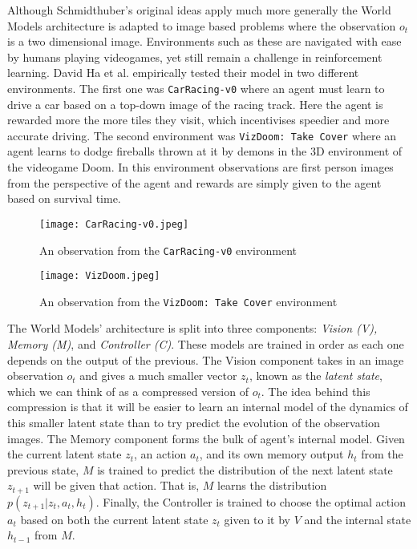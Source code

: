 \documentclass{article}
\numberwithin{figure}{section}
\theoremstyle{definition}
\begin{document}
Although Schmidthuber's original ideas apply much more generally the World Models architecture is adapted to image based problems where the observation $o_t$ is a two dimensional image.
Environments such as these are navigated with ease by humans playing videogames, yet still remain a challenge in reinforcement learning.
David Ha et al. empirically tested their model in two different environments.
The first one was \texttt{CarRacing-v0} where an agent must learn to drive a car based on a top-down image of the racing track. %
Here the agent is rewarded more the more tiles they visit, which incentivises speedier and more accurate driving.
The second environment was \texttt{VizDoom: Take Cover} where an agent learns to dodge fireballs thrown at it by demons in the 3D environment of the videogame Doom.
In this environment observations are first person images from the perspective of the agent and rewards are simply given to the agent based on survival time.

\begin{figure}[h]
  \centering
  \begin{minipage}{0.45\textwidth}
      \centering
      \texttt{[image: CarRacing-v0.jpeg]} %
      \caption{An observation from the \texttt{CarRacing-v0} environment}
  \end{minipage}\hfill
  \begin{minipage}{0.45\textwidth}
      \centering
      \texttt{[image: VizDoom.jpeg]} %
      \caption{An observation from the \texttt{VizDoom: Take Cover} environment}
  \end{minipage}
\end{figure}

The World Models' architecture is split into three components: \textit{Vision (V), Memory (M)}, and \textit{Controller (C)}.
These models are trained in order as each one depends on the output of the previous.
The Vision component %
takes in an image observation $o_t$ and gives a much smaller vector $z_t$, known as the \textit{latent state}, which we can think of as a compressed version of $o_t$.
The idea behind this compression is that it will be easier to learn an internal model of the dynamics of this smaller latent state than to try predict the evolution of the observation images. 
The Memory component forms the bulk of agent's internal model.
Given the current latent state $z_t$, an action $a_t$, and its own memory output $h_{t}$ from the previous state, $M$ is trained to predict the distribution of the next latent state $z_{t+1}$ will be given that action.
That is, $M$ learns the distribution $p(z_{t+1} | z_t, a_t, h_t)$.
Finally, the Controller is trained to choose the optimal action $a_t$ based on both the current latent state $z_t$ given to it by $V$ and the internal state $h_{t-1}$ from $M$. 
\end{document}
